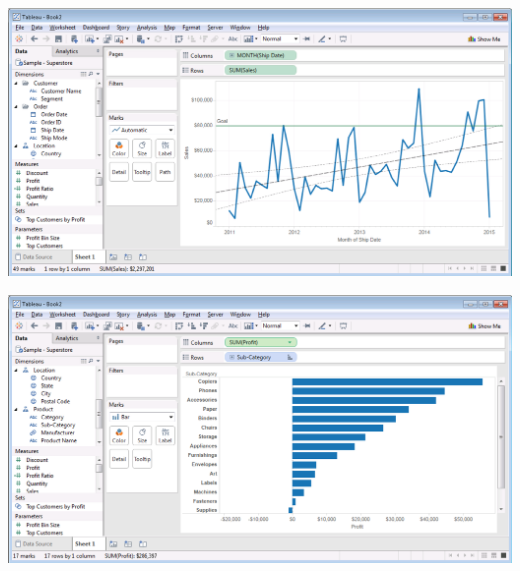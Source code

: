 \documentclass[xcolor=svgnames]{beamer} %
\begin{document}
\begin{frame}
\begin{center}
\includegraphics[width=.9\textwidth]{img/trendref}
\end{center}
\end{frame}







\begin{frame}
\begin{center}
\includegraphics[width=.9\textwidth]{img/sorting}
\end{center}
\end{frame}




\end{document}
